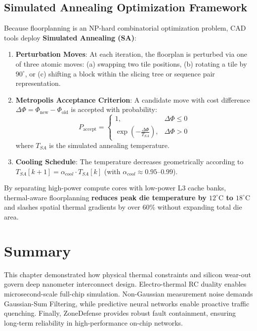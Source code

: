 \subsection{Simulated Annealing Optimization Framework}
Because floorplanning is an NP-hard combinatorial optimization problem, CAD tools deploy \textbf{Simulated Annealing (SA)}:
\begin{enumerate}
    \item \textbf{Perturbation Moves}: At each iteration, the floorplan is perturbed via one of three atomic moves: (a) swapping two tile positions, (b) rotating a tile by $90^\circ$, or (c) shifting a block within the slicing tree or sequence pair representation.
    \item \textbf{Metropolis Acceptance Criterion}: A candidate move with cost difference $\Delta \Phi = \Phi_{\mathrm{new}} - \Phi_{\mathrm{old}}$ is accepted with probability:
    \begin{equation}
    P_{\mathrm{accept}} = 
    \begin{cases}
    1, & \Delta \Phi \le 0 \\
    \exp\left(-\frac{\Delta \Phi}{T_{SA}}\right), & \Delta \Phi > 0
    \end{cases}
    \label{eq:ch7_metropolis}
    \end{equation}
    where $T_{SA}$ is the simulated annealing temperature.
    \item \textbf{Cooling Schedule}: The temperature decreases geometrically according to $T_{SA}[k+1] = \alpha_{cool} \cdot T_{SA}[k]$ (with $\alpha_{cool} \approx 0.95\text{--}0.99$).
\end{enumerate}
By separating high-power compute cores with low-power L3 cache banks, thermal-aware floorplanning \textbf{reduces peak die temperature by $12^\circ\mathrm{C}$ to $18^\circ\mathrm{C}$} and slashes spatial thermal gradients by over $60\%$ without expanding total die area.

\section{Summary}
\label{sec:ch7_summary}

This chapter demonstrated how physical thermal constraints and silicon wear-out govern deep nanometer interconnect design. Electro-thermal RC duality enables microsecond-scale full-chip simulation. Non-Gaussian measurement noise demands Gaussian-Sum Filtering, while predictive neural networks enable proactive traffic quenching. Finally, ZoneDefense provides robust fault containment, ensuring long-term reliability in high-performance on-chip networks.

